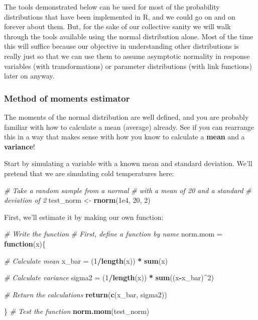 \documentclass[
]{book}
\newenvironment{Shaded}{\begin{snugshade}}{\end{snugshade}}
\newcommand{\CommentTok}[1]{\textcolor[rgb]{0.56,0.35,0.01}{\textit{#1}}}
\newcommand{\ControlFlowTok}[1]{\textcolor[rgb]{0.13,0.29,0.53}{\textbf{#1}}}
\newcommand{\DecValTok}[1]{\textcolor[rgb]{0.00,0.00,0.81}{#1}}
\newcommand{\FloatTok}[1]{\textcolor[rgb]{0.00,0.00,0.81}{#1}}
\newcommand{\KeywordTok}[1]{\textcolor[rgb]{0.13,0.29,0.53}{\textbf{#1}}}
\newcommand{\NormalTok}[1]{#1}
\newcommand{\OperatorTok}[1]{\textcolor[rgb]{0.81,0.36,0.00}{\textbf{#1}}}
\newcommand{\StringTok}[1]{\textcolor[rgb]{0.31,0.60,0.02}{#1}}
\begin{document}
The tools demonstrated below can be used for most of the probability distributions that have been implemented in R, and we could go on and on forever about them. But, for the sake of our collective sanity we will walk through the tools available using the normal distribution alone. Most of the time this will suffice because our objective in understanding other distributions is really just so that we can use them to assume asymptotic normality in response variables (with transformations) or parameter distributions (with link functions) later on anyway.

\hypertarget{method-of-moments-estimator}{%
\subsubsection{Method of moments estimator}\label{method-of-moments-estimator}}

The moments of the normal distribution are well defined, and you are probably familiar with how to calculate a mean (average) already. See if you can rearrange this in a way that makes sense with how you know to calculate a \textbf{mean} and a \textbf{variance}!

Start by simulating a variable with a known mean and standard deviation. We'll pretend that we are simulating cold temperatures here:

\begin{Shaded}
\begin{Highlighting}[]
\CommentTok{# Take a random sample from a normal}
\CommentTok{# with a mean of 20 and a standard}
\CommentTok{# deviation of 2}
\NormalTok{test_norm <-}\StringTok{ }\KeywordTok{rnorm}\NormalTok{(}\FloatTok{1e4}\NormalTok{, }\DecValTok{20}\NormalTok{, }\DecValTok{2}\NormalTok{)}
\end{Highlighting}
\end{Shaded}

First, we'll estimate it by making our own function:

\begin{Shaded}
\begin{Highlighting}[]
\CommentTok{# Write the function}
\CommentTok{# First, define a function by name}
\NormalTok{norm.mom =}\StringTok{ }\ControlFlowTok{function}\NormalTok{(x)\{      }
  
  \CommentTok{# Calculate mean}
\NormalTok{  x_bar =}\StringTok{ }\NormalTok{(}\DecValTok{1}\OperatorTok{/}\KeywordTok{length}\NormalTok{(x)) }\OperatorTok{*}\StringTok{ }\KeywordTok{sum}\NormalTok{(x) }
  
  \CommentTok{# Calculate variance}
\NormalTok{  sigma2 =}\StringTok{ }\NormalTok{(}\DecValTok{1}\OperatorTok{/}\KeywordTok{length}\NormalTok{(x)) }\OperatorTok{*}\StringTok{ }\KeywordTok{sum}\NormalTok{((x}\OperatorTok{-}\NormalTok{x_bar)}\OperatorTok{^}\DecValTok{2}\NormalTok{)}
  
  \CommentTok{# Return the calculations}
  \KeywordTok{return}\NormalTok{(}\KeywordTok{c}\NormalTok{(x_bar, sigma2))      }
  
\NormalTok{\}}
\CommentTok{# Test the function}
\KeywordTok{norm.mom}\NormalTok{(test_norm)}
\end{Highlighting}
\end{Shaded}
\end{document}

